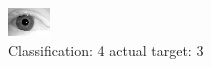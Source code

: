 \begin{figure}[h!]
\begin{center}
\includegraphics[width=0.60\columnwidth]{figures/ID2076_class_4_target_3.png}
\end{center}
\caption{ Classification: 4 actual target: 3}
\label{fig:ID2076_class_4_target_3}
\end{figure}
